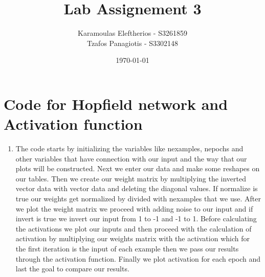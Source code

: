 \documentclass{article}
\title{Lab Assignement 3}
\date{\today}
\author{
	Karamoulas Eleftherios - S3261859\\
	Tzafos Panagiotis - S3302148\\
}
\begin{document}
\maketitle
\section{Code for Hopfield network and Activation function}
\begin{enumerate}
\item The code starts by initializing the variables like nexamples, nepochs and other variables that have connection with our input and the way that our plots will be constructed. Next we enter our data and make some reshapes on our tables. Then we create our weight matrix by multiplying the inverted vector data with vector data and deleting the diagonal values. If normalize is true our weights get normalized by divided with nexamples that we use. After we plot the weight matrix we proceed with adding noise to our input and if invert is true we invert our input from 1 to -1 and -1 to 1. Before calculating the activations we plot our inputs and then proceed with the calculation of activation by multiplying our weights matrix with the activation which for the first iteration is the input of each example then we pass our results through the activation function. Finally we plot activation for each epoch and last the goal to compare our results.


\end{enumerate}
\end{document}
